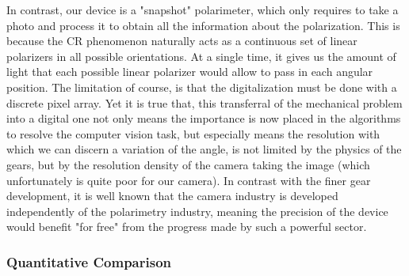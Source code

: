 \documentclass[11pt, a4paper, twoside]{article} %
\begin{document}
In contrast, our device is a "snapshot" polarimeter, which only requires to take a photo and process it to obtain all the information about the polarization. This is because the CR phenomenon naturally acts as a continuous set of linear polarizers in all possible orientations. At a single time, it gives us the amount of light that each possible linear polarizer would allow to pass in each angular position. The limitation of course, is that the digitalization must be done with a discrete pixel array. Yet it is true that, this transferral of the mechanical problem into a digital one not only means the importance is now placed in the algorithms to resolve the computer vision task, but especially means the resolution with which we can discern a variation of the angle, is not limited by the physics of the gears, but by the resolution density of the camera taking the image (which unfortunately is quite poor for our camera). In contrast with the finer gear development, it is well known that the camera industry is developed independently of the polarimetry industry, meaning the precision of the device would benefit "for free" from the progress made by such a powerful sector.\vspace{-0.4cm}

\subsubsection*{Quantitative Comparison \vspace{-0.2cm}}
\end{document}
